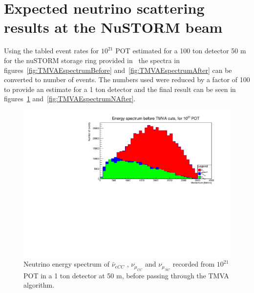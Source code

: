 \section{Expected neutrino scattering results at the NuSTORM beam}

Using the tabled event rates for $10^{21}$ POT estimated for a 100 ton detector 50 m for the nuSTORM storage ring provided in~\cite{118Soler} the spectra in figures~\ref{fig:TMVAEspectrumBefore} and~\ref{fig:TMVAEspectrumAfter} can be converted to number of events. The numbers used were reduced by a factor of 100 to provide an estimate for a 1 ton detector and the final result can be seen in figures~\ref{fig:TMVAEspectrumNBefore} and~\ref{fig:TMVAEspectrumNAfter}.

\begin{figure}[h!]
\centering
\includegraphics[width=.9\textwidth]{figures/NeutrinoChap/NuSTORM/ActualNumEvents.pdf}
\caption{Neutrino energy spectrum of $\bar{\nu}_{eCC}$ , $\nu_{\mu_{CC}}$ and $\nu_{\mu_{NC}}$ recorded from $10^{21}$ POT in a 1 ton detector at 50 m, before passing through the TMVA algorithm.}
\label{fig:TMVAEspectrumNBefore}
\end{figure}

